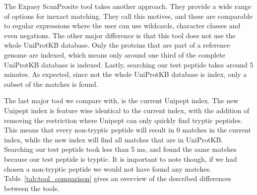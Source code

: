 \documentclass[11pt]{article}
\newenvironment{Table}
{\par\medskip\noindent\minipage{\linewidth}}
{\endminipage\par\medskip}
\begin{document}
\begin{multicols}{2}
        The Expasy ScanProsite tool takes another approach.
        They provide a wide range of options for inexact matching.
        They call this motives, and these are comparable to regular expressions where the user can use wildcards, character classes and even negations.
        The other major difference is that this tool does not use the whole UniProtKB database.
        Only the proteins that are part of a reference genome are indexed, which means only around one third of the complete UniProtKB database is indexed.
        Lastly, searching our test peptide takes around 5 minutes.
        As expected, since not the whole UniProtKB database is index, only a subset of the matches is found.

        The last major tool we compare with, is the current Unipept index.
        The new Unipept index is feature wise identical to the current index, with the addition of removing the restriction where Unipept can only quickly find tryptic peptides.
        This means that every non-tryptic peptide will result in 0 matches in the current index, while the new index will find all matches that are in UniProtKB\@.
        Searching our test peptide took less than 5 ms, and found the same matches because our test peptide is tryptic.
        It is important to note though, if we had chosen a non-tryptic peptide we would not have found any matches.
        Table~\ref{tab:tool_comparison} gives an overview of the described differences between the tools.

        \begin{Table}
            \centering
            \label{tab:tool_comparison}
        \end{Table}



\end{multicols}
\end{document}
